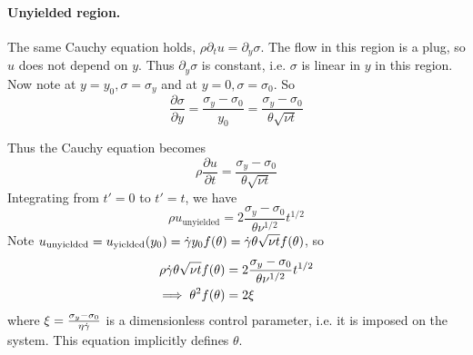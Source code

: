 \documentclass{jknotes}
\begin{document}
\paragraph{Unyielded region.} The same Cauchy equation holds, $\rho \partial_t
u = \partial_y \sigma$. The flow in this region is a plug, so $u$ does not
depend on $y$. Thus $\partial_y \sigma$ is constant, i.e. $\sigma$ is linear
in $y$ in this region. Now note at $y=y_0, \sigma=\sigma_y$ and at $y=0,
\sigma=\sigma_0$. So
\begin{equation}
	\frac{\partial \sigma}{\partial y} = \frac{\sigma_y - \sigma_0}{y_0} =
		\frac{\sigma_y - \sigma_0}{\theta \sqrt{\nu t}}
\end{equation}

Thus the Cauchy equation becomes
\begin{equation}
	\rho \frac{\partial u}{\partial t} = \frac{\sigma_y - \sigma_0}{\theta
	\sqrt{\nu t}}
\end{equation}
Integrating from $t' = 0$ to $t' = t$, we have
\begin{equation}
	\rho u_{\text{unyielded}} = 2 \frac{\sigma_y - \sigma_0}{\theta \nu^{1/2}}
	t^{1/2}
\end{equation}
Note $u_{\text{unyielded}} = u_{\text{yielded}}(y_0) = \dot{\gamma} y_0 f(\theta) =
\dot{\gamma} \theta \sqrt{\nu t} f(\theta)$, so
\begin{align}
	\rho \dot{\gamma} \theta \sqrt{\nu t} f(\theta) &= 2 \frac{\sigma_y -
	\sigma_0}{\theta \nu^{1/2}}t^{1/2}\\
	\implies \theta^2 f(\theta) &= 2 \xi
\end{align}
where $\xi = \frac{\sigma_y - \sigma_0}{\eta \dot{\gamma}}$ is a dimensionless
control parameter, i.e. it is imposed on the system. This equation implicitly
defines $\theta$.
\end{document}
